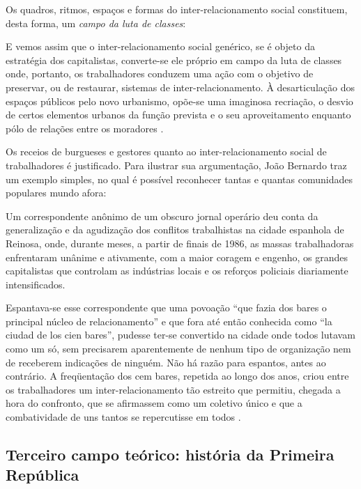 Os quadros, ritmos, espaços e formas do inter-relacionamento social constituem, desta forma, um \textit{campo da luta de classes}:

\begin{citacao}
E vemos assim que o inter-relacionamento social genérico, se é objeto da estratégia dos capitalistas, converte-se ele próprio em campo da luta de classes onde, portanto, os trabalhadores conduzem uma ação com o objetivo de preservar, ou de restaurar, sistemas de inter-relacionamento. À desarticulação dos espaços públicos pelo novo urbanismo, opõe-se uma imaginosa recriação, o desvio de certos elementos urbanos da função prevista e o seu aproveitamento enquanto pólo de relações entre os moradores \cite[p.~331]{BERNARDO1991}. 
\end{citacao}

Os receios de burgueses e gestores quanto ao inter-relacionamento social de trabalhadores é justificado. Para ilustrar sua argumentação, João Bernardo traz um exemplo simples, no qual é possível reconhecer tantas e quantas comunidades populares mundo afora:

\begin{citacao}
Um correspondente anônimo de um obscuro jornal operário deu conta da generalização e da agudização dos conflitos trabalhistas na cidade espanhola de Reinosa, onde, durante meses, a partir de finais de 1986, as massas trabalhadoras enfrentaram unânime e ativamente, com a maior coragem e engenho, os grandes capitalistas que controlam as indústrias locais e os reforços policiais diariamente intensificados.

Espantava-se esse correspondente que uma povoação ``que fazia dos bares o principal núcleo de relacionamento'' e que fora até então conhecida como ``la ciudad de los cien bares'', pudesse ter-se convertido na cidade onde todos lutavam como um só, sem precisarem aparentemente de nenhum tipo de organização nem de receberem indicações de ninguém. Não há razão para espantos, antes ao contrário. A freqüentação dos cem bares, repetida ao longo dos anos, criou entre os trabalhadores um inter-relacionamento tão estreito que permitiu, chegada a hora do confronto, que se afirmassem como um coletivo único e que a combatividade de uns tantos se repercutisse em todos \cite[p.~329-330]{BERNARDO1991}.
\end{citacao}

\subsection{Terceiro campo teórico: história da Primeira República}
\label{subsec:histprirep}

